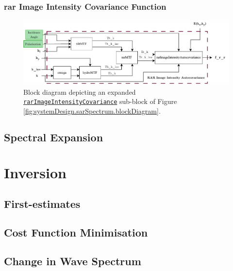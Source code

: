 \subsubsection{\acs{rar} Image Intensity Covariance Function}

\begin{figure}[H]
    \centering
    \includegraphics[width=.95\linewidth]{Figures/PipelineDesign/RARAutocovariance.pdf}
    \caption{Block diagram depicting an expanded \href{https://github.com/JNSRYA006/sar-parameter-extraction-pipeline/blob/main/functions/hasselmann/helperFunctions.m}{\lstinline{rarImageIntensityCovariance}} sub-block of Figure \ref{fig:systemDesign.sarSpectrum.blockDiagram}.}
    \label{fig:systemDesign.sarSpectrum.blockDiagram.rarCo}
\end{figure}

\subsection{Spectral Expansion} \label{subsec:systemDesign.sarSpectrum.spectralExpan}



\section{Inversion} \label{sec:systemDesign.inversion}

\subsection{First-estimates} \label{subsec:systemDesign.inversion.firstEstimates}

\subsection{Cost Function Minimisation} \label{subsec:systemDesign.inversion.costFuncMinimise}


\subsection{Change in Wave Spectrum} \label{subsec:systemDesign.inversion.changeWaveSpectrum}


